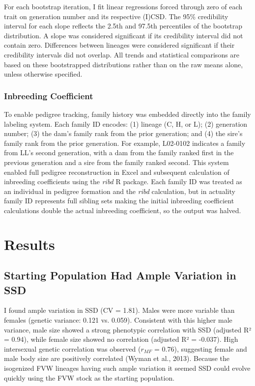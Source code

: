 \documentclass[12pt,reqno,oneside]{report}
\begin{document}
For each bootstrap iteration, I fit linear regressions forced through zero of each trait on generation number and its respective (I)CSD. The 95\% credibility interval for each slope reflects the 2.5th and 97.5th percentiles of the bootstrap distribution. A slope was considered significant if its credibility interval did not contain zero. Differences between lineages were considered significant if their credibility intervals did not overlap. All trends and statistical comparisons are based on these bootstrapped distributions rather than on the raw means alone, unless otherwise specified.

\subsubsection{Inbreeding Coefficient} 

To enable pedigree tracking, family history was embedded directly into the family labeling system. Each family ID encodes: (1) lineage (C, H, or L); (2) generation number; (3) the dam's family rank from the prior generation; and (4) the sire's family rank  from the prior generation. For example, L02-0102 indicates a family from LL's second generation, with a dam from the family ranked first in the previous generation and a sire from the family ranked second. This system enabled full pedigree reconstruction in Excel and subsequent calculation of inbreeding coefficients using the \textit{ribd} R package. Each family ID was treated as an individual in pedigree formation and the \textit{ribd} calculation, but in actuality family ID represents full sibling sets making the initial inbreeding coefficient calculations double the actual inbreeding coefficient, so the output was halved.

\section{Results} 

\subsection{Starting Population Had Ample Variation in SSD}

I found ample variation in SSD (CV = 1.81). Males were more variable than females (genetic variance: 0.121 vs. 0.059). Consistent with this higher male variance, male size showed a strong phenotypic correlation with SSD (adjusted R² = 0.94), while female size showed no correlation (adjusted R² = -0.037). High intersexual genetic correlation was observed (\(r_{MF}\) = 0.76), suggesting female and male body size are positively correlated (Wyman et al., 2013). Because the isogenized FVW lineages having such ample variation it seemed SSD could evolve quickly using the FVW stock as the starting population.
\end{document}
